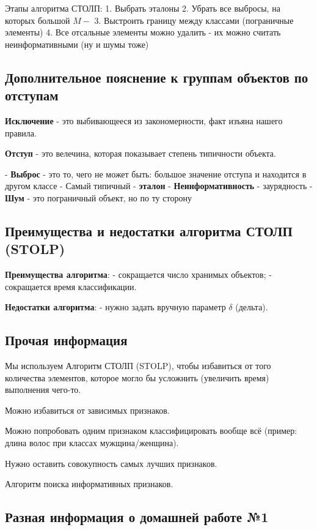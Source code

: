 Этапы алгоритма СТОЛП:
1. Выбрать эталоны
2. Убрать все выбросы, на которых большой $M-$
3. Выстроить границу между классами (пограничные элементы)
4. Все отсальные элементы можно удалить - их можно считать неинформативными
(ну и шумы тоже)

\subsection{Дополнительное пояснение к группам объектов по отступам}

\textbf{Исключение} - это выбивающееся из закономерности, факт изъяна нашего
правила.

\textbf{Отступ} - это велечина, которая показывает степень типичности объекта.

- \textbf{Выброс} - это то, чего не может быть: большое значение отступа и
находится в другом классе
- Самый типичный - \textbf{эталон}
- \textbf{Неинформативность} - заурядность
- \textbf{Шум} - это пограничный объект, но по ту сторону

\subsection{Преимущества и недостатки алгоритма СТОЛП (STOLP)}

\textbf{Преимущества алгоритма}:
- сокращается число хранимых объектов;
- сокращается время классификации.

\textbf{Недостатки алгоритма}:
- нужно задать вручную параметр $\delta$ (дельта).

\subsection{Прочая информация}

Мы используем Алгоритм СТОЛП (STOLP), чтобы избавиться от того количества
элементов, которое могло бы усложнить (увеличить время) выполнения чего-то.

Можно избавиться от зависимых признаков.

Можно попробовать одним признаком классифицировать вообще всё (пример:
длина волос при классах мужщина/женщина).

Нужно оставить совокупность самых лучших признаков.

Алгоритм поиска информативных признаков.

\subsection{Разная информация о домашней работе №1}

